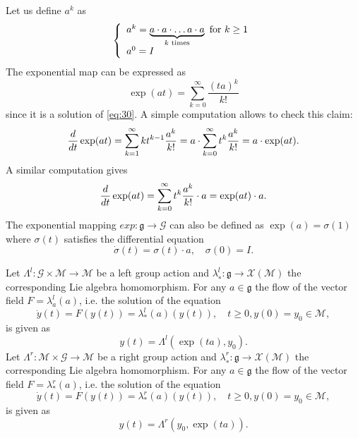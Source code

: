 Let us define $a^k$ as
\begin{equation}
  \label{eq:31}
  \left\{\begin{array}[l]{l}
    a^k = \underbrace{a\glaw a \glaw \ldots a\glaw a}_{k \text{ times}} \text{ for } k \geq 1 \\
    a^0  = I
  \end{array}\right.
\end{equation}
The exponential map can be expressed as
\begin{equation}
  \label{eq:32}
  \exp(at) = \sum_{k=0}^\infty \frac{(ta)^k}{k!}
\end{equation}
since it is  a solution of \eqref{eq:30}. A simple computation allows to check this claim:
\begin{equation}
  \label{eq:33}
   \frac{d}{dt}\exp(at) = \sum_{k=1}^\infty  k t^{k-1} \frac{a^k}{k!} = a \cdot \sum_{k=0}^\infty  t^{k} \frac{a^k}{k!} = a \cdot \exp(at).
\end{equation}
A similar computation gives
\begin{equation}
  \label{eq:34}
  \frac{d}{dt}\exp(at)  = \sum_{k=0}^\infty  t^{k} \frac{a^k}{k!} \cdot a = \exp(at) \cdot a.
\end{equation}
The exponential mapping $exp : \mathfrak g \rightarrow \mathcal G$ can also be defined as $\exp(a) = \sigma(1)$ where $\sigma (t)$ satisfies the  differential equation
\begin{equation}
  \label{eq:35}
  \dot \sigma(t) = \sigma(t) \cdot a, \quad \sigma (0) = I.
\end{equation}

\begin{theorem}
  \label{Theorem:solutionofLieODE}
  Let $\Lambda^l:\mathcal G\times\mathcal M \rightarrow \mathcal M$ be a left  group action and $\lambda^l_{∗} : \mathfrak g\rightarrow \mathcal X(\mathcal M)$ the corresponding Lie algebra homomorphism. For any $a \in \mathfrak g$ the flow of the vector field $F = \lambda^l_{a}(a)$, i.e. the solution of the equation
  \begin{equation}
    \dot y(t) = F(y(t)) = \lambda^l_{*}(a)(y(t)),\quad  t \geq 0, y(0) = y_0 \in \mathcal M,\label{eq:36}
\end{equation}
  is given as
  \begin{equation}
y(t) = \Lambda^l(\exp(ta), y_0).\label{eq:37}
\end{equation}
Let $\Lambda^r:\mathcal M\times\mathcal G \rightarrow \mathcal M$ be a right group action and $\lambda^r_{∗} : \mathfrak g\rightarrow \mathcal X(\mathcal M)$ the corresponding Lie algebra homomorphism. For any $a \in \mathfrak g$ the flow of the vector field $F = \lambda^r_{*}(a)$, i.e. the solution of the equation
  \begin{equation}
    \dot y(t) = F(y(t)) = \lambda^r_{*}(a)(y(t)),\quad  t \geq 0, y(0) = y_0 \in \mathcal M,\label{eq:38}
\end{equation}
  is given as
  \begin{equation}
y(t) = \Lambda^r(y_0,\exp(ta)).\label{eq:39}
\end{equation}

\end{theorem}


